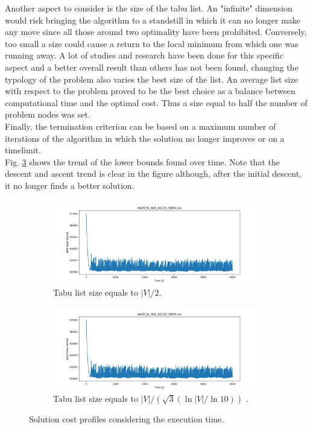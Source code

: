 Another aspect to consider is the size of the tabu list. An "infinite" dimension would risk bringing the algorithm to a standstill in which it can no longer make any move since all those around two optimality have been prohibited. Conversely, too small a size could cause a return to the local minimum from which one was running away. A lot of studies and research have been done for this specific aspect \cite{Nababan_2019, Tsubakitani1998} and a better overall result than others has not been found, changing the typology of the problem also varies the best size of the list. An average list size with respect to the problem proved to be the best choice as a balance between computational time and the optimal cost. Thus a size equal to half the number of problem nodes was set.\\
Finally, the termination criterion can be based on a maximum number of iterations of the algorithm in which the solution no longer improves or on a timelimit.\\
Fig. \ref{fig:tabu_search_perform_time} shows the trend of the lower bounds found over time. Note that the descent and ascent trend is clear in the figure although, after the initial descent, it no longer finds a better solution.
\begin{figure}[!h]
	\begin{subfigure}{.5\columnwidth}
		\centering
		\includegraphics[width=.70\columnwidth]{../res/lb_tabu_search_n_greedy_d2103.png}
		\caption{Tabu list size equals to $ |V| / 2 $.}
		\label{fig:tabu_search_perform_time}
	\end{subfigure}
	\begin{subfigure}{.5\columnwidth}
		\centering
		\includegraphics[width=.70\columnwidth]{../res/lb_tabu_search_n_greedy_d2103_r3.png}
		\caption{Tabu list size equals to $ |V| / (\sqrt{3} (\ln{|V|} / \ln{10})) $ .}
		\label{fig:tabu_search_perform_time}
	\end{subfigure}
	\caption{Solution cost profiles considering the execution time.}
	\label{fig:tabu_search_perform_time}
\end{figure}
